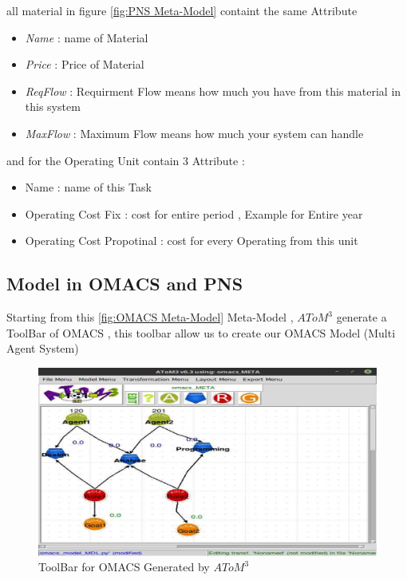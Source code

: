 all material in figure \ref{fig:PNS Meta-Model} containt the same Attribute
\begin{itemize}


\item \textit{Name} : name of Material 
\item \textit{Price} : Price of Material
\item \textit{ReqFlow} : Requirment Flow means how much you have from this material in this system
\item \textit{MaxFlow} : Maximum Flow means how much your system can handle

\end{itemize}



and for the Operating Unit contain 3 Attribute : 
\begin{itemize}

\item Name : name of this Task 
\item Operating Cost Fix  : cost for entire period ,  Example for Entire year
\item Operating Cost Propotinal  :  cost for every Operating from this unit

\end{itemize}
 


\subsection{ Model in OMACS and PNS }

Starting from this  \ref{fig:OMACS Meta-Model} Meta-Model , $AToM^3$ generate a ToolBar of OMACS  , this toolbar 
allow us to create our OMACS Model (Multi Agent System)

\begin{figure}[th]
		\centering
 	\includegraphics[scale=0.5]{chapiter3/img/omacsMDL}
	\caption{\label{fig:OMACS Model}ToolBar for OMACS Generated by $AToM^3$ }
\end{figure} 

